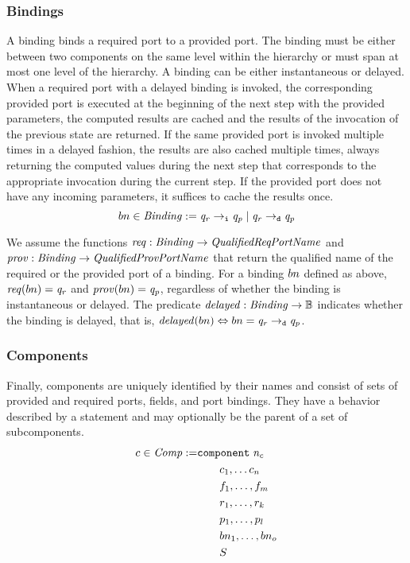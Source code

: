 \documentclass[a4paper,10pt,english]{article}
\begin{document}
\subsubsection{Bindings}
A binding binds a required port to a provided port. The binding must be either between two components on the
same level within the hierarchy or must span at most one level of the hierarchy. A binding can be either
instantaneous or delayed. When a required port with a delayed binding is invoked, the corresponding provided port is executed
at the beginning of the next step with the provided parameters, the computed results are cached and the results of the invocation
of the previous state are returned. If the same provided port is invoked multiple times in a delayed fashion, the results are also
cached multiple times, always returning the computed values during the next step that corresponds to the appropriate invocation
during the current step. If the provided port does not have any incoming parameters, it suffices to cache the results once.
\begin{equation*} 
	bn \in \mathit{Binding} := \mathit{q_r} \; \mathtt{\rightarrow_i} \; \mathit{q_p} \mid
		\mathit{q_r} \; \mathtt{\rightarrow_d} \; \mathit{q_p}
\end{equation*}

We assume the functions $\mathit{req} : \mathit{Binding} \rightarrow \mathit{QualifiedReqPortName}$ and $\mathit{prov} : \mathit{Binding} \rightarrow \mathit{QualifiedProvPortName}$ that return
the qualified name of the required or the provided port of a binding. For a binding $bn$ defined as above, $\mathit{req}(bn) =
\mathit{q_r}$ and $\mathit{prov}(bn) = \mathit{q_p}$, regardless of whether the binding is instantaneous or delayed. The
predicate $\mathit{delayed} : \mathit{Binding} \rightarrow \mathbb{B}$ indicates whether the binding is delayed, that is, $\mathit{delayed}(bn) \Leftrightarrow
bn = \mathit{q_r} \; \mathtt{\rightarrow_d} \; \mathit{q_p}$.

\subsubsection{Components}
Finally, components are uniquely identified by their names and consist of sets
of provided and required ports, fields, and port bindings. They have a behavior described by a statement and may optionally be
the parent of a set of subcomponents.
\begin{align*}
	c \in \mathit{Comp} := &\mathtt{component} \; \mathit{n_c} \\
		&\qquad c_1, \ldots c_n \\
		&\qquad f_1, \ldots, f_m \\
		&\qquad r_1, \ldots, r_k \\
		&\qquad p_1, \ldots, p_l \\
		&\qquad bn_1, \ldots, bn_o \\
		&\qquad S
\end{align*}
\end{document}
